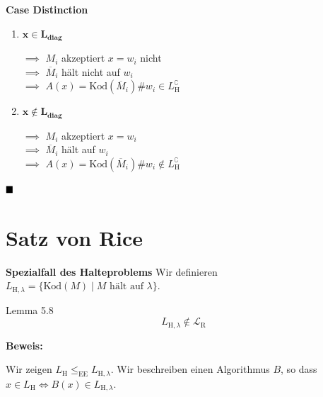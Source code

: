\documentclass[a4paper, 11pt]{article}
\def\Lr{\mathcal{L}_\text{R}}
\newcommand\myTitle[1]{{\large \textbf {#1}}}
\begin{document}
                        \textbf{Case Distinction}
                        \begin{enumerate}[label=\Roman*.]
                            \item $\mathbf{x \in L_{\text{diag}}}$
                            \begin{center}
                                $\implies$ $M_i$ akzeptiert $x = w_i$ nicht\\
                                $\implies$ $\overline{M}_i$ hält nicht auf $w_i$\\
                                $\implies$  $A(x) = \text{Kod}(\overline{M}_i)\#w_i \in L_{\text{H}}^\complement$
                            \end{center}
                            
                            \item $\mathbf{x \notin L_{\text{diag}}}$
                            \begin{center}
                                $\implies$ $M_i$ akzeptiert $x = w_i$\\
                                $\implies$ $\overline{M}_i$ hält auf $w_i$\\
                                $\implies$  $A(x) = \text{Kod}(\overline{M}_i)\#w_i \notin L_{\text{H}}^\complement$
                            \end{center}
                        \end{enumerate}
                        $\hfill\blacksquare$
                    
                
                \section{Satz von Rice}
                
                
                    \myTitle{Spezialfall des Halteproblems}
                    Wir definieren $L_{\text{H}, \lambda} = \{\text{Kod}(M) \mid M \text{ hält auf }\lambda\}$.
                    \begin{mainbox}{Lemma 5.8}
                        $$L_{\text{H}, \lambda} \notin \Lr$$
                    \end{mainbox}
                    \textbf{Beweis: }
                
                    Wir zeigen $L_\text{H} \leq_\text{EE} L_{\text{H}, \lambda}$. Wir beschreiben einen Algorithmus $B$, so dass $x \in L_\text{H} \iff B(x) \in L_{\text{H}, \lambda}$.
                
\end{document}
